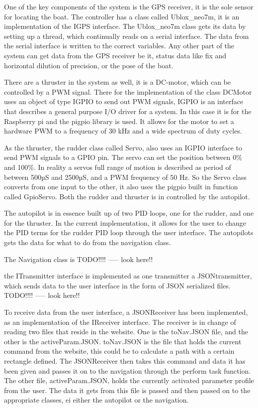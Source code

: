 One of the key components of the system is the GPS receiver, it is the sole sensor for locating the boat. The controller has a class called Ublox\_neo7m, it is an implementation of the IGPS interface. The Ublox\_neo7m class gets its data by setting up a thread, which continually reads on a serial interface. The data from the serial interface is written to the correct variables. Any other part of the system can get data from the GPS receiver be it, status data like fix and horizontal dilution of precision, or the pose of the boat. 

There are a thruster in the system as well, it is a DC-motor, which can be controlled by a PWM signal. There for the implementation of the class DCMotor uses an object of type IGPIO to send out PWM signals, IGPIO is an interface that describes a general purpose I/O driver for a system. In this case it is for the Raspberry pi and the pigpio library is used\cite{pigpio}. It allows for the motor to set a hardware PWM to a frequency of 30 kHz and a wide spectrum of duty cycles.

As the thruster, the rudder class called Servo, also uses an IGPIO interface to send PWM signals to a GPIO pin. The servo can set the position between 0\% and 100\%. In reality a servos full range of motion is described as period of between 500µS and 2500µS, and a PWM frequency of 50 Hz. So the Servo class converts from one input to the other, it also uses the pigpio built in function called GpioServo. Both the rudder and thruster is in controlled by the autopilot.

The autopilot is in essence built up of two PID loops, one for the rudder, and one for the thruster. In the current implementation, it allows for the user to change the PID terms for the rudder PID loop through the user interface. The autopilots gets the data for what to do from the navigation class.

The Navigation class is TODO!!!! ----- look here!!

the ITransmitter interface is implemented as one transmitter a JSONtransmitter, which sends data to the user interface in the form of JSON serialized files. TODO!!!! ----- look here!!

To receive data from the user interface, a JSONReceiver has been implemented, as an implementation of the IReceiver interface. The receiver is in change of reading two files that reside in the website. One is the toNav.JSON file, and the other is the activeParam.JSON. toNav.JSON is the file that holds the current command from the website, this could be to calculate a path with a certain rectangle defined. The JSONReceiver then takes this command and data it has been given and passes it on to the navigation through the perform task function. The other file, activeParam.JSON, holds the currently activated parameter profile from the user. The data it gets from this file is passed and then passed on to the appropriate classes, ei either the autopilot or the navigation.

